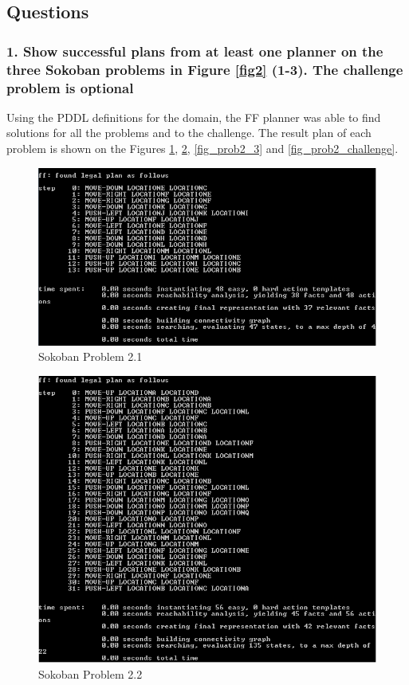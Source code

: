 \documentclass[10pt, letter]{article}
\begin{document}
\subsection{Questions}
\subsubsection*{1. Show successful plans from at least one planner on the three Sokoban problems in Figure \ref{fig2} (1-3). The challenge problem is optional}
Using the PDDL definitions for the domain, the FF planner was able to find solutions for all the problems and to the challenge. The result plan of each problem is shown on the Figures \ref{fig_prob2_1}, \ref{fig_prob2_2}, \ref{fig_prob2_3} and \ref{fig_prob2_challenge}.

\begin{figure}[h]
  \centering
    \includegraphics[scale = 1.0]{images/FF_Solution_p2_1}
    \caption{Sokoban Problem 2.1}
  \label{fig_prob2_1}
\end{figure}

\begin{figure}[h]
  \centering
    \includegraphics[scale = 1.0]{images/FF_Solution_p2_2}
    \caption{Sokoban Problem 2.2}
  \label{fig_prob2_2}
\end{figure}
\end{document}
